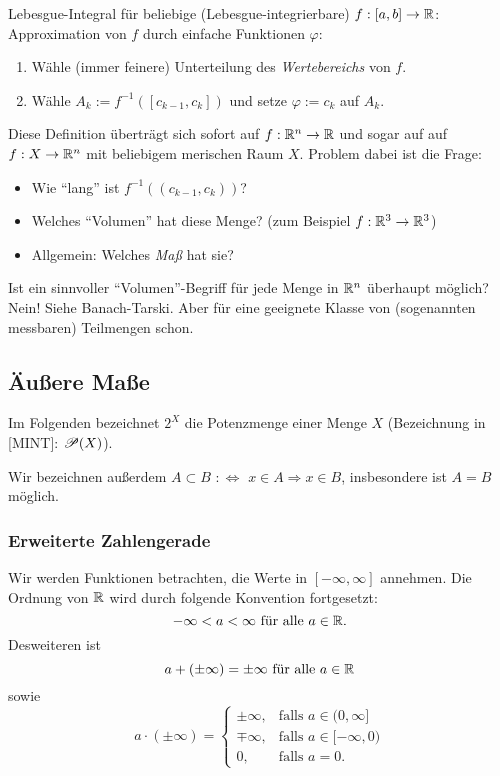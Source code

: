 Lebesgue-Integral für beliebige (Lebesgue-integrierbare) $f:[a,b]\to\mathbb{R}$: Approximation von $f$ durch einfache Funktionen $\varphi$:
\begin{enumerate}
 \item Wähle (immer feinere) Unterteilung des \emph{Wertebereichs} von $f$.
 \item Wähle $A_k := f^{-1}([c_{k-1},c_k])$ und setze $\varphi := c_k$ auf $A_k$.
\end{enumerate}

Diese Definition überträgt sich sofort auf $f: \mathbb{R}^n \to \mathbb{R}$ und sogar auf auf $f: X \to \mathbb{R}^n$ mit beliebigem merischen Raum $X$. Problem dabei ist die Frage: 
\begin{itemize}
 \item Wie ``lang'' ist $f^{-1}((c_{k-1},c_k))$?
 \item Welches ``Volumen'' hat diese Menge? (zum Beispiel $f: \mathbb{R}^3 \to \mathbb{R}^3$)
 \item Allgemein: Welches \emph{Maß} hat sie?
\end{itemize}
Ist ein sinnvoller ``Volumen''-Begriff für jede Menge in $\mathbb{R}^n$ überhaupt möglich? Nein! Siehe Banach-Tarski. Aber für eine geeignete Klasse von (sogenannten messbaren) Teilmengen schon.

\subsection{Äußere Maße}
Im Folgenden bezeichnet $2^X$ die Potenzmenge einer Menge $X$ (Bezeichnung in [MINT]: $\mathscr{P}(X)$).

Wir bezeichnen außerdem $A \subset B$ $:\Leftrightarrow$ $x \in A \Rightarrow x \in B$, insbesondere ist $A = B$ möglich.

\subsubsection{Erweiterte Zahlengerade}
Wir werden Funktionen betrachten, die Werte in $[-\infty, \infty]$ annehmen. Die Ordnung von $\mathbb{R}$ wird durch folgende Konvention fortgesetzt:
\[ - \infty < a < \infty \text{ für alle } a \in \mathbb{R}. \]
Desweiteren ist 
\[ a + (\pm \infty) = \pm \infty \text{ für alle } a \in \mathbb{R} \]
sowie 
\[ a \cdot (\pm \infty) = \begin{cases}
                           \pm \infty, &\text{falls } a \in (0, \infty] \\
                           \mp \infty, &\text{falls } a \in [-\infty, 0) \\
                           0, &\text{falls } a = 0.
                          \end{cases} \]

